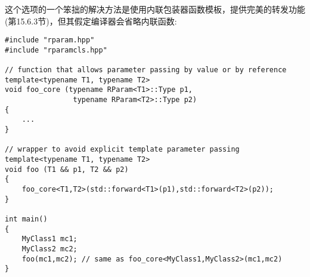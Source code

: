 这个选项的一个笨拙的解决方法是使用内联包装器函数模板，提供完美的转发功能(第15.6.3节)，但其假定编译器会省略内联函数:

\begin{lstlisting}[style=styleCXX]
#include "rparam.hpp"
#include "rparamcls.hpp"

// function that allows parameter passing by value or by reference
template<typename T1, typename T2>
void foo_core (typename RParam<T1>::Type p1,
				typename RParam<T2>::Type p2)
{
	...
}

// wrapper to avoid explicit template parameter passing
template<typename T1, typename T2>
void foo (T1 && p1, T2 && p2)
{
	foo_core<T1,T2>(std::forward<T1>(p1),std::forward<T2>(p2));
}

int main()
{
	MyClass1 mc1;
	MyClass2 mc2;
	foo(mc1,mc2); // same as foo_core<MyClass1,MyClass2>(mc1,mc2)
}
\end{lstlisting}











